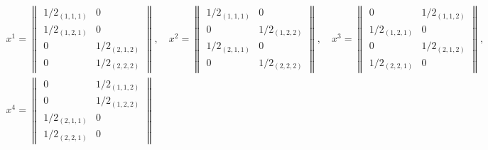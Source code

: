 \begin{gather*}


x^1=


\begin{Vmatrix}


1/2_{(1,1,1)} & 0\\


1/2_{(1,2,1)} & 0\\


0 & 1/2_{(2,1,2)}\\


0 & 1/2_{(2,2,2)}


\end{Vmatrix},\quad


x^2=


\begin{Vmatrix}


1/2_{(1,1,1)} & 0\\


0 & 1/2_{(1,2,2)}\\


1/2_{(2,1,1)} & 0\\


0 & 1/2_{(2,2,2)}


\end{Vmatrix}


,\quad


x^3=


\begin{Vmatrix}


0 & 1/2_{(1,1,2)}\\


1/2_{(1,2,1)} & 0\\


0 & 1/2_{(2,1,2)}\\


1/2_{(2,2,1)} & 0


\end{Vmatrix}


, \\


x^4=


\begin{Vmatrix}


0 & 1/2_{(1,1,2)}\\


0 & 1/2_{(1,2,2)}\\


1/2_{(2,1,1)} & 0\\


1/2_{(2,2,1)} & 0


\end{Vmatrix}



\end{gather*}
